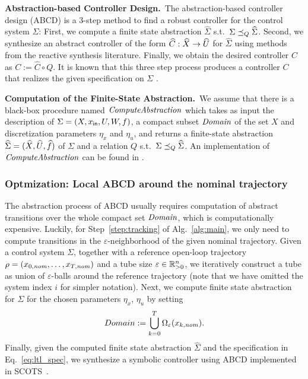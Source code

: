 \smallskip
\noindent\textbf{Abstraction-based Controller Design.}\
The abstraction-based controller design (ABCD) \cite{reissig2016feedback} is a $3$-step method to find a robust controller for the control system $\Sigma$:
First, we compute a finite state abstraction $\widehat{\Sigma}$ s.t.\ $\Sigma \preceq_{Q} \widehat{\Sigma}$.
Second, we synthesize an abstract controller of the form $\widehat{C}:\widehat{X}\rightarrow \widehat{U}$ for $\widehat{\Sigma}$ using methods from the reactive synthesis literature.
Finally, we obtain the desired controller $C$ as $C:=\widehat{C}\circ Q$.
It is known that this three step process produces a controller $C$ that realizes the given specification on $\Sigma$ \cite{reissig2016feedback}.


\smallskip
\noindent\textbf{Computation of the Finite-State Abstraction.}\
We assume that there is a black-box procedure named $\mathit{ComputeAbstraction}$ which takes as input the description of $\Sigma = (X,x_{\mathsf{in}},U,W,f)$, a compact subset $\mathit{Domain}$ of the set $X$ and discretization parameters $\eta_x$ and $\eta_u$, and returns a finite-state abstraction $\widehat{\Sigma} = (\widehat{X},\widehat{U},\widehat{f})$ of $\Sigma$ and a relation $Q$ s.t.\ $\Sigma\preceq_{Q} \widehat{\Sigma}$.
An implementation of $\mathit{ComputeAbstraction}$ can be found in \cite{reissig2016feedback}.








\subsubsection{Optmization: Local ABCD around the nominal trajectory}\hfill

The abstraction process of ABCD usually requires computation of abstract transitions over the whole compact set $\mathit{Domain}$, which is computationally expensive.
Luckily, for Step~\ref{step:tracking} of Alg.~\ref{alg:main}, we only need to compute transitions in the $\varepsilon$-neighborhood of the given nominal trajectory.
Given a control system $\Sigma$, together with a reference open-loop trajectory $\rho=(x_{0,\mathit{nom}},\ldots,x_{T,\mathit{nom}})$ and a tube size $\varepsilon\in \mathbb{R}_{>0}^n$, we iteratively construct a tube as union of $\varepsilon$-balls around the reference trajectory (note that we have omitted  the system index $i$ for simpler notation).
Next, we compute finite state abstraction for $\Sigma$ for the chosen parameters $\eta_x$, $\eta_u$ by setting
\begin{equation*}
Domain:=\bigcup_{k=0}^T\Omega_{\varepsilon}(x_{k,\mathit{nom}}).
\end{equation*}
Finally, given the computed finite state abstraction $\widehat \Sigma$ and the specification in Eq.~\eqref{eq:ltl_spec}, we synthesize a symbolic controller using ABCD implemented in SCOTS~\cite{Rungger2016scots}. %


